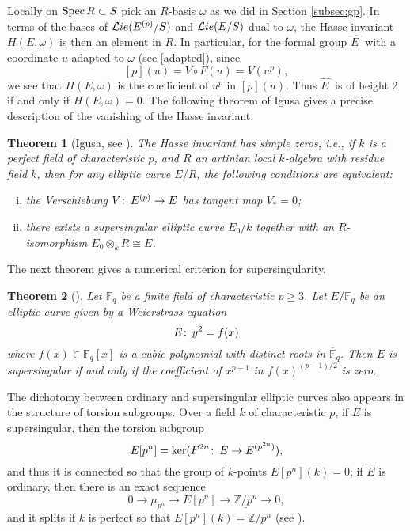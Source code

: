 \documentclass{gtpart}
\newtheorem{thm}{Theorem}
\theoremstyle{definition}
\theoremstyle{remark}
\def\co{\colon\thinspace}
\newcommand{\mb}[1]{\mathbb{#1}}
\newcommand{\Spec}{{\rm Spec\thinspace}}
\newcommand{\cF}{\overline {\mb F}}
\newcommand{\CLie}{{\cal L}ie}
\newcommand{\BF}{{\mb F}}
\newcommand{\BZ}{{\mb Z}}
\newcommand{\HE}{\widehat{E~}\!}
\numberwithin{equation}{section}
\numberwithin{thm}{section}
\begin{document}
Locally on $\Spec R \subset S$ pick an $R$-basis $\omega$ as we did in 
Section \ref{subsec:gp}.  In terms of the bases of $\CLie(E^{(p)}/S)$ 
and $\CLie(E/S)$ dual to $\omega$, the Hasse invariant $H(E,\omega)$ is 
then an element in $R$.  In particular, for the formal group $\HE$ with 
a coordinate $u$ adapted to $\omega$ (see \eqref{adapted}), since 
\[
 [p](u) = V \circ F (u) = V(u^p), 
\]
we see that $H(E,\omega)$ is the coefficient of $u^p$ in $[p](u)$.  Thus 
$\HE$ is of height 2 if and only if $H(E,\omega) = 0$.  The following 
theorem of Igusa gives a precise description of the vanishing of the 
Hasse invariant.  

\begin{thm}[Igusa, see {\cite[12.4.3]{KM}}]
\label{thm:igusa}
 The Hasse invariant has simple zeros, i.e., if $k$ is a perfect field 
 of characteristic $p$, and $R$ an artinian local $k$-algebra with 
 residue field $k$, then for any elliptic curve $E/R$, the following 
 conditions are equivalent: 
 \begin{enumerate}[(i)]
  \item the Verschiebung $V \co E^{(p)} \to E$ has tangent map $V_* = 0$; 

  \item there exists a supersingular elliptic curve $E_0/k$ together 
  with an $R$-isomorphism $E_0 \otimes_k R \cong E$.  
 \end{enumerate}
\end{thm}

The next theorem gives a numerical criterion for supersingularity.  

\begin{thm}[{\cite[V.4.1a]{AEC}}]
\label{thm:h}
 Let $\BF_q$ be a finite field of characteristic $p \geq 3$.  Let 
 $E/\BF_q$ be an elliptic curve given by a Weierstrass equation 
 \[
  E \co y^2 = f(x) 
 \]
 where $f(x) \in \BF_q[x]$ is a cubic polynomial with distinct roots in 
 $\cF_q$.  Then $E$ is supersingular if and only if the coefficient of 
 $x^{p-1}$ in $f(x)^{(p-1)/2}$ is zero.  
\end{thm}

The dichotomy between ordinary and supersingular elliptic curves also 
appears in the structure of torsion subgroups.  Over a field $k$ of 
characteristic $p$, if $E$ is supersingular, then the torsion subgroup 
\begin{equation}
\label{ssing}
 E[p^n] = \ker (F^{2n} \co E \to E^{(p^{2n})}), 
\end{equation}
and thus it is connected so that the group of $k$-points 
$E[p^n](k) = 0$; if $E$ is ordinary, then there is an exact sequence 
\begin{equation}
\label{ord}
 0 \to \mu_{p^n} \to E[p^n] \to \underline{\BZ/p^n} \to 0, 
\end{equation}
and it splits if $k$ is perfect so that $E[p^n](k) = \BZ/p^n$ (see 
\cite[12.3.3-4 and 12.2.7]{KM}).  
\end{document}
